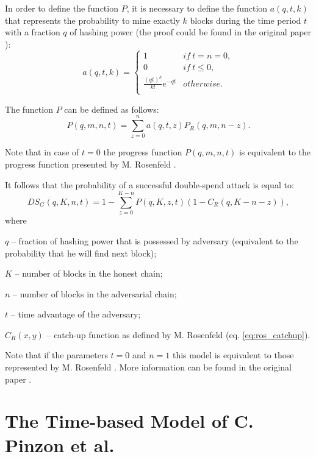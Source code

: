 \documentclass[10pt,a4paper]{article}
\numberwithin{equation}{section} %
\theoremstyle{plain}
\theoremstyle{definition}
\theoremstyle{remark}
\begin{document}
	In order to define the function \(P\), it is necessary to define the function \(a(q,t,k)\) that represents the probability to mine exactly \(k\) blocks during the time period \(t\) with a fraction \(q\) of hashing power (the proof could be found in the original paper \cite{PR16}):
	\[a(q,t,k) =
	    \left\{
            \begin{array}{ll}
                1 & if\  t = n = 0, \\
                0 & if\  t \leq 0, \\
                \frac{(qt)^k}{k!}e^{-qt} & otherwise. \\
            \end{array}
        \right.
	\]
	
	The function \(P\) can be defined as follows:
	\begin{equation}  \label{eq:pin_G_prog}
	    P(q,m,n,t) = \sum_{z=0}^{n}a(q,t,z)P_R(q,m,n-z).
	\end{equation}
	
	Note that in case of \(t=0\) the progress function \(P(q,m,n,t)\) is equivalent to the progress function presented by M. Rosenfeld \cite{R14}.
	
	It follows that the probability of a successful double-spend attack is equal to:
	\begin{equation}  \label{eq:pin_G_DS}
	    DS_G(q,K,n,t) = 1 - \sum_{z=0}^{K-n}P(q,K,z,t)(1 - C_R(q,K-n-z)),
	\end{equation}
	where
	
	\(q\) -- fraction of hashing power that is possessed by adversary (equivalent to the probability that he will find next block);
	
	\(K\) -- number of blocks in the honest chain;
	
	\(n\) -- number of blocks in the adversarial chain;
	
	\(t\) -- time advantage of the adversary;
	
	\(C_R(x,y)\) -- catch-up function as defined by M. Rosenfeld (eq. \ref{eq:ros_catchup}).
	
	Note that if the parameters \(t=0\) and \(n=1\) this model is equivalent to those represented by M. Rosenfeld \cite{R14}. 
	More information can be found in the original paper \cite{PR16}. 
	
	\section{The Time-based Model of C. Pinzon et al.} \label{sec:time-based-model}
	
\end{document}
